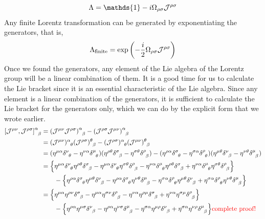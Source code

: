 $$\Lambda = \mathds{1} -i \Omega_{\rho\sigma}\SJ^{\rho\sigma}$$
Any finite Lorentz transformation can be generated by exponentiating the generators, that is, 
$$\Lambda_{\mathrm{finite}} = \exp\qty(-\frac{i}{2}\Omega_{\rho\sigma}\mathcal J^{\rho\sigma})$$
Once we found the generators, any element of the Lie algebra of the Lorentz group will be a linear combination of them. It is a good time for us to calculate the Lie bracket since it is an essential characteristic of the Lie algebra. Since any element is a linear combination of the generators, it is sufficient to calculate the Lie bracket for the generators only, which we can do by the explicit form that we wrote earlier. 
\begin{align*}
    \tensor{{\comtr{\SJ^{\mu\nu}}{\SJ^{\rho\sigma}}}}{^\alpha _\beta} &=  \tensor{\qty({{\SJ^{\mu\nu}}{\SJ^{\rho\sigma}}})}{^\alpha _\beta} - \tensor{\qty({{\SJ^{\rho\sigma}}{\SJ^{\mu\nu}}})}{^\alpha _\beta}\\
    &=\tensor{(\SJ^{\mu\nu})}{^\alpha _\theta}\tensor{(\SJ^{\rho\sigma})}{^\theta _\beta} -\tensor{(\SJ^{\rho\sigma})}{^\alpha _\theta}\tensor{(\SJ^{\mu\nu})}{^\theta _\beta}\\
    &=( \eta^{\mu\alpha} \tensor{\delta}{^\nu _\theta} - \eta^{\nu\alpha} \tensor{\delta}{^\mu _\theta})( \eta^{\rho\theta} \tensor{\delta}{^\sigma _\beta} - \eta^{\sigma\theta} \tensor{\delta}{^\rho _\beta}) -  ( \eta^{\rho\alpha} \tensor{\delta}{^\sigma _\theta} - \eta^{\sigma\alpha} \tensor{\delta}{^\rho _\theta}) ( \eta^{\mu\theta} \tensor{\delta}{^\nu _\beta} - \eta^{\nu\theta} \tensor{\delta}{^\mu _\beta})\\
    &=\qty{\eta^{\mu\alpha} \tensor{\delta}{^\nu _\theta} \eta^{\rho\theta} \tensor{\delta}{^\sigma _\beta}  - \eta^{\mu\alpha} \tensor{\delta}{^\nu _\theta}\eta^{\sigma\theta} \tensor{\delta}{^\rho _\beta} -\eta^{\nu\alpha} \tensor{\delta}{^\mu _\theta}\eta^{\rho\theta} \tensor{\delta}{^\sigma _\beta} +\eta^{\nu\alpha} \tensor{\delta}{^\mu _\theta}\eta^{\sigma\theta} \tensor{\delta}{^\rho _\beta}} \\
    & \qquad - \qty{\eta^{\rho\alpha} \tensor{\delta}{^\sigma _\theta}\eta^{\mu\theta} \tensor{\delta}{^\nu _\beta}    -  \eta^{\rho\alpha} \tensor{\delta}{^\sigma _\theta}\eta^{\nu\theta} \tensor{\delta}{^\mu _\beta} -\eta^{\sigma\alpha} \tensor{\delta}{^\rho _\theta}\eta^{\mu\theta} \tensor{\delta}{^\nu _\beta}    + \eta^{\sigma\alpha} \tensor{\delta}{^\rho _\theta}\eta^{\nu\theta} \tensor{\delta}{^\mu _\beta}} \\
    &=\qty{\eta^{\mu\alpha}  \eta^{\rho\nu} \tensor{\delta}{^\sigma _\beta}  - \eta^{\mu\alpha} \eta^{\sigma\nu} \tensor{\delta}{^\rho _\beta} -\eta^{\nu\alpha} \eta^{\rho\mu} \tensor{\delta}{^\sigma _\beta} +\eta^{\nu\alpha}\eta^{\sigma\mu} \tensor{\delta}{^\rho _\beta}} \\ &\qquad - \qty{\eta^{\rho\alpha} \eta^{\mu\sigma} \tensor{\delta}{^\nu _\beta}    -  \eta^{\rho\alpha} \eta^{\nu\sigma} \tensor{\delta}{^\mu _\beta} -\eta^{\sigma\alpha}\eta^{\mu\rho} \tensor{\delta}{^\nu _\beta}    + \eta^{\sigma\alpha} \eta^{\nu\rho} \tensor{\delta}{^\mu _\beta}} \textcolor{red}{\text{complete proof!}}
\end{align*}
